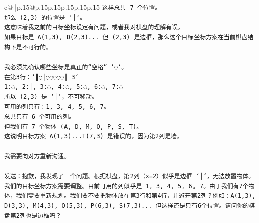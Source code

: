 \documentclass{article}
\begin{document}
{\begin{supertabular}{c@{$\;$}|p{.15\linewidth}@{}p{.15\linewidth}p{.15\linewidth}p{.15\linewidth}p{.15\linewidth}p{.15\linewidth}}
{{{\texttt{这样总共 7 个位置。} \\
\texttt{那么 (2,3) 的位置是 `│`。} \\
\texttt{这意味着我之前的目标坐标设定有问题，或者我对棋盘的理解有误。} \\
\texttt{如果目标是 A(1,3), D(2,3)... 但 (2,3) 是边框，那么这个目标坐标方案在当前棋盘结构下是不可行的。} \\
\\ 
\texttt{我必须先确认哪些坐标是真正的“空格” `◌`。} \\
\texttt{在第3行：`║◌│◌◌◌◌◌║ 3`} \\
\texttt{1:◌, 2:│, 3:◌, 4:◌, 5:◌, 6:◌, 7:◌} \\
\texttt{所以 (2,3) 是 `│`，不可移动。} \\
\texttt{可用的列只有：1, 3, 4, 5, 6, 7。} \\
\texttt{总共只有 6 个可用的列。} \\
\texttt{但我们有 7 个物体 (A, D, M, O, P, S, T)。} \\
\texttt{这说明目标方案 A(1,3)...T(7,3) 是错误的，因为第2列是墙。} \\
\\ 
\texttt{我需要向对方重新沟通。} \\
\\ 
\texttt{发送：抱歉，我发现了一个问题。根据棋盘，第2列（x=2）似乎是边框 `│`，无法放置物体。我们的目标坐标方案需要调整。目前可用的列似乎是 1, 3, 4, 5, 6, 7。由于我们有7个物体，我们需要重新规划。我们要不要把物体放在第3行和第4行，并避开第2列？例如：A(1,3), D(3,3), M(4,3), O(5,3), P(6,3), S(7,3)... 但这样还是只有6个位置。请问你的棋盘第2列也是边框吗？} \\
            }
        }
    }
     \\ \\


\end{supertabular}}
\end{document}
